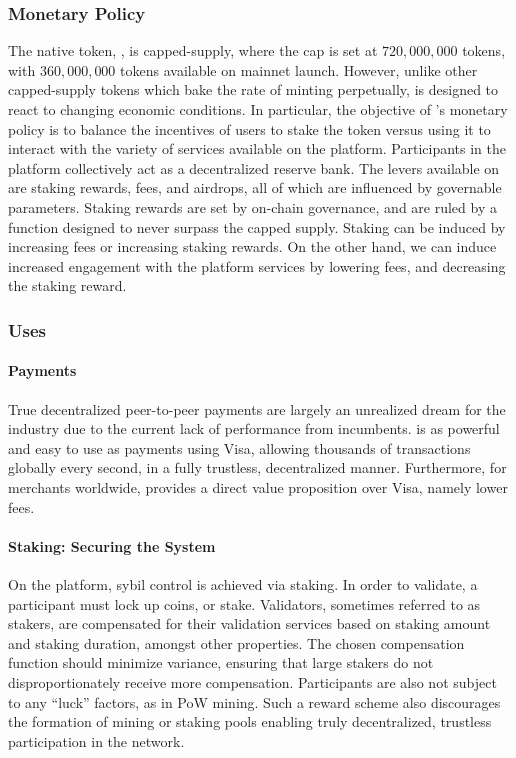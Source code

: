 \documentclass[runningheads]{llncs}
\begin{document}
\subsubsection{Monetary Policy}
The native token, \AVATokenName{}, is capped-supply, where the cap is set at $720,000,000$ tokens, with $360,000,000$ tokens available on mainnet launch. However, unlike other capped-supply tokens which bake the rate of minting perpetually, \AVATokenName{} is designed to react to changing economic conditions. In particular, the objective of \AVATokenName{}'s monetary policy is to balance the incentives of users to stake the token versus using it to interact with the variety of services available on the platform. Participants in the platform collectively act as a decentralized reserve bank. The levers available on \AVAPlatformName{} are staking rewards, fees, and airdrops, all of which are influenced by governable parameters. Staking rewards are set by on-chain governance, and are ruled by a function designed to never surpass the capped supply. Staking can be induced by increasing fees or increasing staking rewards. On the other hand, we can induce increased engagement with the \AVAPlatformName{} platform services by lowering fees, and decreasing the staking reward. 

\subsubsection{Uses}
\paragraph{Payments}
True decentralized peer-to-peer payments are largely an unrealized dream for the industry due to the current lack of performance from incumbents. \AVATokenName{} is as powerful and easy to use as payments using Visa, allowing thousands of transactions globally every second, in a fully trustless, decentralized manner. Furthermore, for merchants worldwide, \AVATokenName{} provides a direct value proposition over Visa, namely lower fees.

\paragraph{Staking: Securing the System}
On the \AVAPlatformName{} platform, sybil control is achieved via staking. In order to validate, a participant must lock up coins, or stake. Validators, sometimes referred to as stakers, are compensated for their validation services based on staking amount and staking duration, amongst other properties. The chosen compensation function should minimize variance, ensuring that large stakers do not disproportionately receive more compensation. Participants are also not subject to any ``luck'' factors, as in PoW mining. Such a reward scheme also discourages the formation of mining or staking pools enabling truly decentralized, trustless participation in the network.
\end{document}
